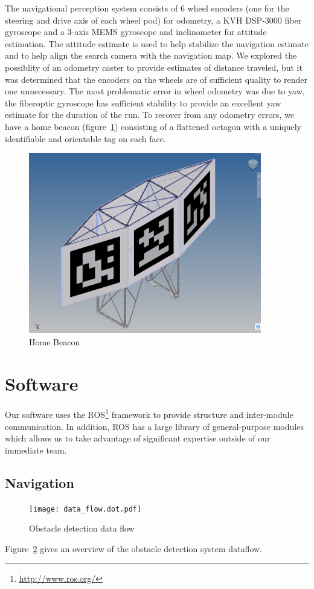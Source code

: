 \documentclass[12pt]{article}
\begin{document}
The navigational perception system consists of 6 wheel encoders (one for the
steering and drive axis of each wheel pod) for odometry, a KVH DSP-3000 fiber
gyroscope and a 3-axis MEMS gyroscope and inclinometer for attitude estimation.
The attitude estimate is used to help stabilize the navigation estimate and to
help align the search camera with the navigation map. We explored the
possiblity of an odometry caster to provide estimates of distance traveled, but
it was determined that the encoders on the wheels are of sufficient quality to
render one unnecessary. The most problematic error in wheel odometry was due to
yaw, the fiberoptic gyroscope has sufficient stability to provide an excellent
yaw estimate for the duration of the run. To recover from any odometry errors,
we have a home beacon (figure~\ref{fig_home_beacon}) consisting of a flattened
octagon with a uniquely identifiable and orientable tag on each face.
\begin{figure}[htbp]
\centering
\includegraphics[width=4in]{beacon-front.png}
\caption{Home Beacon}
\label{fig_home_beacon}
\end{figure}

\section{Software}\label{Software}
Our software uses the ROS\footnote{\url{http://www.ros.org/}} framework to
provide structure and inter-module communication. In addition, ROS has a large
library of general-purpose modules which allows us to take advantage of
significant expertise outside of our immediate team.

\subsection{Navigation}\label{Navigation}
\begin{figure}[htbp]
\centering
\texttt{[image: data\_flow.dot.pdf]}
\caption{Obstacle detection data flow}
\label{fig_df_nav}
\end{figure}
Figure~\ref{fig_df_nav} gives an overview of the obstacle detection system
dataflow.
\end{document}
